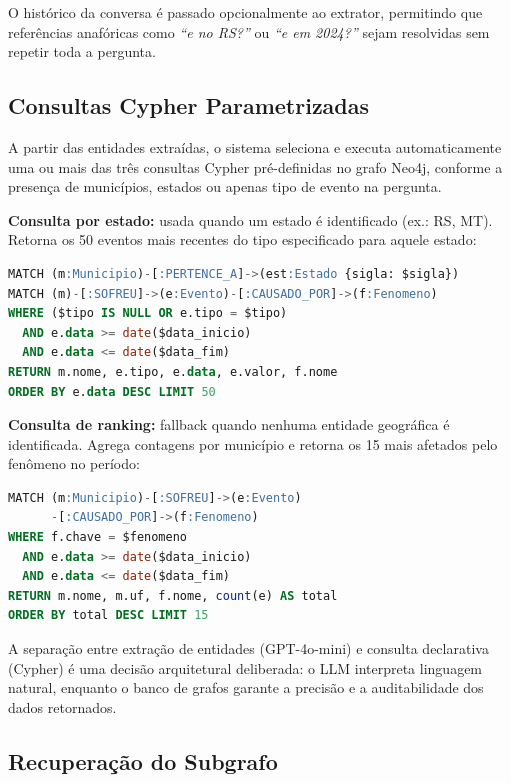 \documentclass[conference]{IEEEtran}
\begin{document}
O histórico da conversa é passado opcionalmente ao extrator,
permitindo que referências anafóricas como \emph{``e no RS?''} ou
\emph{``e em 2024?''} sejam resolvidas sem repetir toda a pergunta.

\subsection{Consultas Cypher Parametrizadas}

A partir das entidades extraídas, o sistema seleciona e executa
automaticamente uma ou mais das três consultas Cypher
pré-definidas no grafo Neo4j, conforme a presença de municípios,
estados ou apenas tipo de evento na pergunta.

\textbf{Consulta por estado:} usada quando um estado é identificado
(ex.: RS, MT). Retorna os 50 eventos mais recentes do tipo
especificado para aquele estado:

\begin{lstlisting}[language=SQL, caption={}]
MATCH (m:Municipio)-[:PERTENCE_A]->(est:Estado {sigla: $sigla})
MATCH (m)-[:SOFREU]->(e:Evento)-[:CAUSADO_POR]->(f:Fenomeno)
WHERE ($tipo IS NULL OR e.tipo = $tipo)
  AND e.data >= date($data_inicio)
  AND e.data <= date($data_fim)
RETURN m.nome, e.tipo, e.data, e.valor, f.nome
ORDER BY e.data DESC LIMIT 50
\end{lstlisting}

\textbf{Consulta de ranking:} fallback quando nenhuma entidade
geográfica é identificada. Agrega contagens por município e retorna
os 15 mais afetados pelo fenômeno no período:

\begin{lstlisting}[language=SQL, caption={}]
MATCH (m:Municipio)-[:SOFREU]->(e:Evento)
      -[:CAUSADO_POR]->(f:Fenomeno)
WHERE f.chave = $fenomeno
  AND e.data >= date($data_inicio)
  AND e.data <= date($data_fim)
RETURN m.nome, m.uf, f.nome, count(e) AS total
ORDER BY total DESC LIMIT 15
\end{lstlisting}

A separação entre extração de entidades (GPT-4o-mini) e consulta
declarativa (Cypher) é uma decisão arquitetural deliberada: o LLM
interpreta linguagem natural, enquanto o banco de grafos garante
a precisão e a auditabilidade dos dados retornados.

\subsection{Recuperação do Subgrafo}
\end{document}
